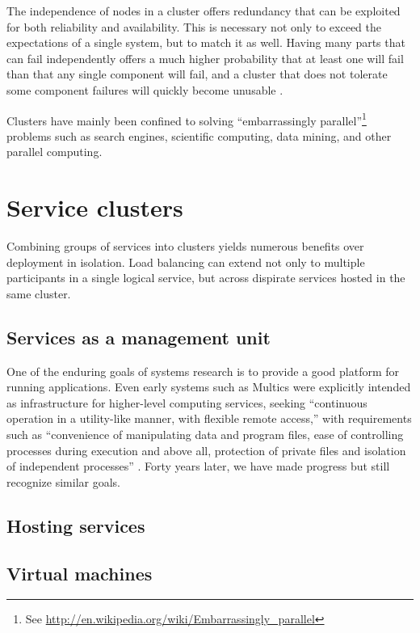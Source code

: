 The independence of nodes in a cluster offers redundancy that can be exploited for both reliability and availability. This is necessary not only to exceed the expectations of a single system, but to match it as well. Having many parts that can fail independently offers a much higher probability that at least one will fail than that any single component will fail, and a cluster that does not tolerate some component failures will quickly become unusable \cite{birrell93}.

Clusters have mainly been confined to solving ``embarrassingly parallel''\footnote{See \url{http://en.wikipedia.org/wiki/Embarrassingly_parallel}} problems such as search engines, scientific computing, data mining, and other parallel computing.

\section{Service clusters}

Combining groups of services into clusters yields numerous benefits over deployment in isolation. Load balancing can extend not only to multiple participants in a single logical service, but across dispirate services hosted in the same cluster.

\subsection{Services as a management unit}

One of the enduring goals of systems research is to provide a good platform for running applications. Even early systems such as Multics were explicitly intended as infrastructure for higher-level computing services, seeking ``continuous operation in a utility-like manner, with flexible remote access,'' with requirements such as ``convenience of manipulating data and program files, ease of controlling processes during execution and above all, protection of private files and isolation of independent processes'' \cite{corbato}. Forty years later, we have made progress but still recognize similar goals.

\subsection{Hosting services}

\subsection{Virtual machines}

